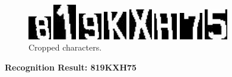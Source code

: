 \documentclass{article}
\begin{document}
\begin{spacing}{1.0}
\begin{itemize}
	\begin{figure}[H]
		\centering
		\begin{minipage}{1cm}
			\includegraphics[width=1cm]{P1010003_0.jpg}
		\end{minipage}
		\begin{minipage}{1cm}
			\includegraphics[width=1cm]{P1010003_1.jpg}
		\end{minipage}
		\begin{minipage}{1cm}
			\includegraphics[width=1cm]{P1010003_2.jpg}
		\end{minipage}
		\begin{minipage}{1cm}
			\includegraphics[width=1cm]{P1010003_3.jpg}
		\end{minipage}
		\begin{minipage}{1cm}
			\includegraphics[width=1cm]{P1010003_4.jpg}
		\end{minipage}
		\begin{minipage}{1cm}
			\includegraphics[width=1cm]{P1010003_5.jpg}
		\end{minipage}
		\begin{minipage}{1cm}
			\includegraphics[width=1cm]{P1010003_6.jpg}
		\end{minipage}
			\begin{minipage}{1cm}
			\includegraphics[width=1cm]{P1010003_7.jpg}
		\end{minipage}
		\caption{Cropped characters.}
	\end{figure}
	\textbf{Recognition Result: 819KXH75}
	

\end{itemize}
\end{spacing}
\end{document}
